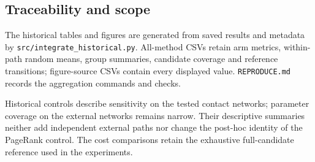 \subsection{Traceability and scope}
The historical tables and figures are generated from saved results and metadata
by \texttt{src/integrate\_historical.py}. All-method CSVs retain arm metrics,
within-path random means, group summaries, candidate coverage and reference
transitions; figure-source CSVs contain every displayed value.
\texttt{REPRODUCE.md} records the aggregation commands and checks.

Historical controls describe sensitivity on the tested contact networks;
parameter coverage on the external networks remains narrow. Their descriptive
summaries neither add independent external paths nor change the post-hoc
identity of the PageRank control. The cost comparisons retain the exhaustive
full-candidate reference used in the experiments.
